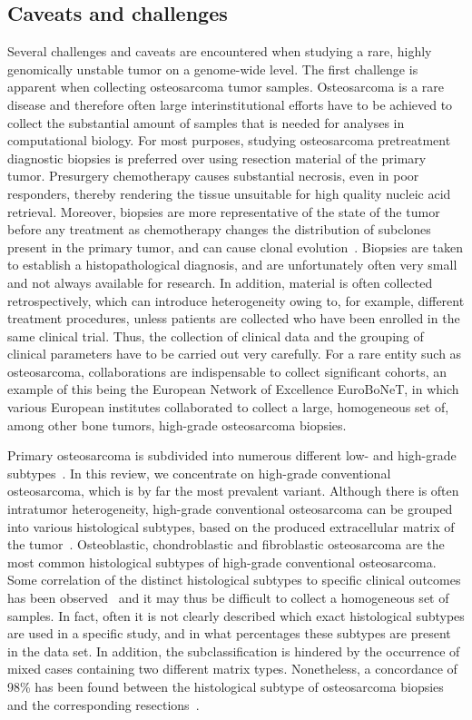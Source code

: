 \subsection{Caveats and challenges}
Several challenges and caveats are encountered when studying
a rare, highly genomically unstable tumor on a genome\hyp{}wide
level. The first challenge is apparent when collecting
osteosarcoma tumor samples. Osteosarcoma is a rare disease
and therefore often large interinstitutional efforts have to be
achieved to collect the substantial amount of samples that is
needed for analyses in computational biology. For most purposes,
studying osteosarcoma pretreatment diagnostic biopsies
is preferred over using resection material of the primary
tumor. Presurgery chemotherapy causes substantial necrosis,
even in poor responders, thereby rendering the tissue unsuitable
for high quality nucleic acid retrieval. Moreover, biopsies
are more representative of the state of the tumor before any
treatment as chemotherapy changes the distribution of subclones
present in the primary tumor, and can cause clonal
evolution~\cite{ding2012clonal}. Biopsies are taken to establish a histopathological
diagnosis, and are unfortunately often very small and not
always available for research. In addition, material is often
collected retrospectively, which can introduce heterogeneity
owing to, for example, different treatment procedures, unless
patients are collected who have been enrolled in the same
clinical trial. Thus, the collection of clinical data and the
grouping of clinical parameters have to be carried out very
carefully. For a rare entity such as osteosarcoma, collaborations
are indispensable to collect significant cohorts, an
example of this being the European Network of Excellence
EuroBoNeT, in which various European institutes collaborated
to collect a large, homogeneous set of, among other
bone tumors, high\hyp{}grade osteosarcoma biopsies.

Primary osteosarcoma is subdivided into numerous different
low- and high\hyp{}grade subtypes~\cite{mohseny2008bone}. In this review, we concentrate
on high\hyp{}grade conventional osteosarcoma, which is by
far the most prevalent variant. Although there is often intratumor
heterogeneity, high\hyp{}grade conventional osteosarcoma
can be grouped into various histological subtypes, based on
the produced extracellular matrix of the tumor~\cite{mohseny2008bone}. Osteoblastic,
chondroblastic and fibroblastic osteosarcoma are the most
common histological subtypes of high\hyp{}grade conventional osteosarcoma.
Some correlation of the distinct histological subtypes
to specific clinical outcomes has been observed~\cite{hauben2002does,hauben2006clinico} and
it may thus be difficult to collect a homogeneous set of samples.
In fact, often it is not clearly described which exact histological
subtypes are used in a specific study, and in what
percentages these subtypes are present in the data set. In
addition, the subclassification is hindered by the occurrence
of mixed cases containing two different matrix types. Nonetheless,
a concordance of 98\% has been found between the
histological subtype of osteosarcoma biopsies and the corresponding
resections~\cite{hauben2002does}.

